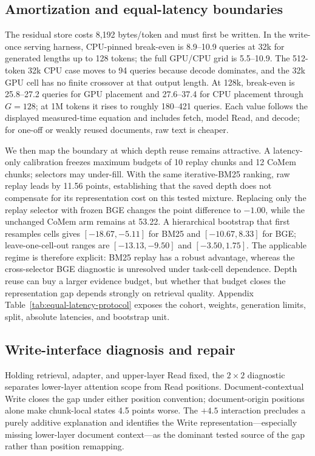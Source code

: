 \subsection{Amortization and equal-latency boundaries}

The residual store costs 8,192 bytes/token and must first be written. In the
write-once serving harness, CPU-pinned break-even is 8.9--10.9 queries at 32k
for generated lengths up to 128 tokens; the full GPU/CPU grid is 5.5--10.9.
The 512-token 32k CPU case moves to 94 queries because decode dominates, and
the 32k GPU cell has no finite crossover at that output length. At 128k,
break-even is 25.8--27.2 queries for GPU placement and 27.6--37.4 for CPU
placement through $G{=}128$; at 1M tokens it rises to roughly 180--421 queries.
Each value follows the displayed measured-time equation and includes fetch,
model Read, and decode; for one-off or weakly reused documents, raw text is
cheaper.

We then map the boundary at which depth reuse remains attractive. A latency-only
calibration freezes maximum budgets of 10 replay chunks and 12 CoMem chunks;
selectors may under-fill. With the same iterative-BM25 ranking, raw replay leads
by 11.56 points, establishing that the saved depth does not compensate for its
representation cost on this tested mixture. Replacing only the replay selector
with frozen BGE changes the point difference to $-1.00$, while the unchanged
CoMem arm remains at 53.22. A hierarchical bootstrap that first resamples cells gives
$[-18.67,-5.11]$ for BM25 and $[-10.67,8.33]$ for BGE; leave-one-cell-out
ranges are $[-13.13,-9.50]$ and $[-3.50,1.75]$. The applicable regime is
therefore explicit: BM25 replay has a robust advantage, whereas the
cross-selector BGE diagnostic is unresolved under task-cell dependence. Depth
reuse can buy a larger evidence budget, but whether that budget closes the
representation gap depends strongly on retrieval quality.
Appendix Table~\ref{tab:equal-latency-protocol} exposes the cohort, weights,
generation limits, split, absolute latencies, and bootstrap unit.

\subsection{Write-interface diagnosis and repair}

Holding retrieval, adapter, and upper-layer Read fixed, the $2{\times}2$
diagnostic separates lower-layer attention scope from Read positions.
Document-contextual Write closes the gap under either position convention;
document-origin positions alone make chunk-local states 4.5 points worse. The $+4.5$ interaction precludes a purely additive explanation and identifies
the Write representation---especially missing lower-layer document context---as
the dominant tested source of the gap rather than position remapping.

